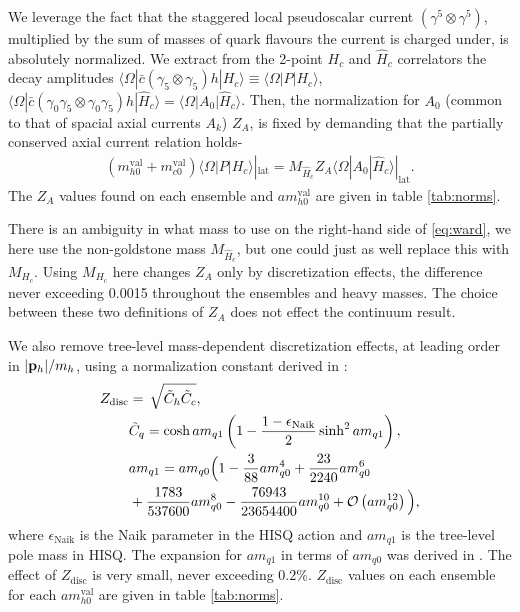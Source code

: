 We leverage the fact that the staggered local pseudoscalar current $(\gamma^5\otimes \gamma^5)$, multiplied by the sum of masses of quark flavours the current is charged under, is absolutely normalized. We extract from the 2-point $H_c$ and $\hat{H}_c$ correlators the decay amplitudes $\langle \Omega | \bar{c} (\gamma_5\otimes \gamma_5) h | H_c \rangle \equiv \langle \Omega | P | H_c \rangle$, $\langle \Omega | \bar{c} (\gamma_0\gamma_5 \otimes \gamma_0\gamma_5) h | \hat{H}_c \rangle = \langle \Omega | A_0 | \hat{H}_c \rangle$. Then, the normalization for $A_0$ (common to that of spacial axial currents $A_k$) $Z_A$, is fixed by demanding that the partially conserved axial current relation holds-
\begin{align}
  (m^{\text{val}}_{h0} + m^{\text{val}}_{c0}) \langle \Omega | P | H_c \rangle|_{\text{lat}} = M_{\hat{H}_c} Z_A \langle \Omega | A_0 | \hat{H}_c \rangle|_{\text{lat}}.
  \label{eq:ward}
\end{align}
The $Z_A$ values found on each ensemble and $am^{\text{val}}_{h0}$ are given in table \ref{tab:norms}.

There is an ambiguity in what mass to use on the right-hand side of \eqref{eq:ward}, we here use the non-goldstone mass $M_{\hat{H}_c}$, but one could just as well replace this with $M_{H_c}$. Using $M_{H_c}$ here changes $Z_A$ only by discretization effects, the difference never exceeding 0.0015 throughout the ensembles and heavy masses. The choice between these two definitions of $Z_A$ does not effect the continuum result.

We also remove tree-level mass-dependent discretization effects, at leading order in $|{\bf{p}}_h|/m_h$, using a normalization constant derived in \cite{Bazavov:2017lyh}:
\begin{align}
  \label{eq:Zdisc}
  Z_{\text{disc}} &=\,\sqrt{ \tilde{C}_h \tilde{C}_c }, \\
  \nonumber
  &\tilde{C}_q = \cosh am_{q1} \left( 1 - {1-\epsilon_{\text{Naik}}\over 2} \sinh^2 am_{q1} \right), \\ \nonumber
  &am_{q1} = am_{q0} \Big( 1 - {3\over 88}am_{q0}^4 + {23\over 2240}am_{q0}^6 \\ \nonumber
  &+ {1783\over 537600} am_{q0}^8 - {76943\over23654400}am_{q0}^{10} + \mathcal{O}\left( am_{q0}^{12} \right) \Big), \nonumber
\end{align}
where $\epsilon_{\text{Naik}}$ is the Naik parameter in the HISQ action and $am_{q1}$ is the tree-level pole mass in HISQ. The expansion for $am_{q1}$ in terms of $am_{q0}$ was derived in \cite{Follana:2006rc}. The effect of $Z_{\text{disc}}$ is very small, never exceeding $0.2\%$. $Z_{\text{disc}}$ values on each ensemble for each $am^{\text{val}}_{h0}$ are given in table \ref{tab:norms}.

